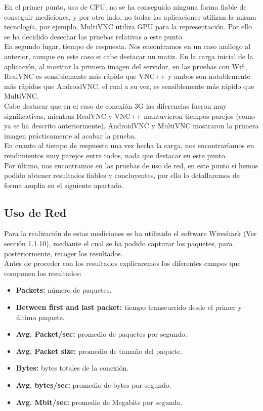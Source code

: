 En el primer punto, uso de CPU, no se ha conseguido ninguna forma fiable de conseguir mediciones, y por otro lado, no todas las aplicaciones utilizan la misma tecnología, por ejemplo, MultiVNC utiliza GPU para la representación. Por ello se ha decidido desechar las pruebas relativas a este punto.\\

En segundo lugar, tiempo de respuesta. Nos encontramos en un caso análogo al anterior, aunque en este caso si cabe destacar un matiz. En la carga inicial de la aplicación, al mostrar la primera imagen del servidor, en las pruebas con Wifi, RealVNC es sensiblemente más rápido que VNC++ y ambos son notablemente más rápidos que AndroidVNC, el cual a su vez, es sensiblemente más rápido que MultiVNC.\\

Cabe destacar que en el caso de conexión 3G las diferencias fueron muy significativas, mientras RealVNC y VNC++ mantuvieron tiempos parejos (como ya se ha descrito anteriormente), AndroidVNC y MultiVNC mostraron la primera imagen prácticamente al acabar la prueba.\\

En cuanto al tiempo de respuesta una vez hecha la carga, nos encontraríamos en rendimientos muy parejos entre todos, nada que destacar en este punto.\\

Por último, nos encontramos en las pruebas de uso de red, en este punto sí hemos podido obtener resultados fiables y concluyentes, por ello lo detallaremos de forma amplia en el siguiente apartado.

\subsection{Uso de Red}

Para la realización de estas mediciones se ha utilizado el software Wireshark (Ver sección 1.1.10), mediante el cual se ha podido capturar los paquetes, para posteriormente, recoger los resultados.\\

Antes de proceder con los resultados explicaremos los diferentes campos que componen los resultados:
\begin{itemize}
\item \textbf{Packets:} número de paquetes.
\item \textbf{Between first and last packet:} tiempo transcurrido desde el primer y último paquete.
\item \textbf{Avg. Packet/sec:} promedio de paquetes por segundo.
\item \textbf{Avg. Packet size:} promedio de tamaño del paquete.
\item \textbf{Bytes:} bytes totales de la conexión.
\item \textbf{Avg. bytes/sec:} promedio de bytes por segundo.
\item \textbf{Avg. Mbit/sec:} promedio de Megabits por segundo.
\end{itemize}

